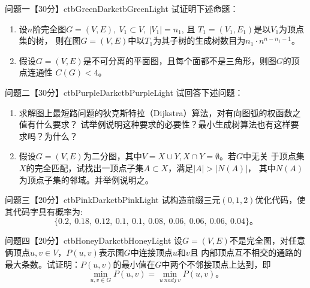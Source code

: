 \documentclass[12pt]{simple_doc}
\begin{document}

    \begin{cbstripe}{问题一【30分】}{ctbGreenDark}{ctbGreenLight}
        试证明下述命题：
        \begin{enumerate}
            \item 设$n$阶完全图$G=(V, E),\ V_1 \subset V,\ \big | V_1 \big | = n_1$, 且
                $T_1=(V_1, E_1)$是以$V_1$为顶点集的树，
                则在图$G=(V, E)$中以$T_1$为其子树的生成树数目为$n_1\cdot n^{n-n_1 -1}$。
            \item 假设$G=(V, E)$是不可分离的平面图，且每个面都不是三角形，则图$G$的顶点连通性
                $C(G) < 4$。
        \end{enumerate}
    \end{cbstripe}

    \begin{cbstripe}{问题二【30分】}{ctbPurpleDark}{ctbPurpleLight}
        试回答下述问题：
        \begin{enumerate}
            \item 求解图上最短路问题的狄克斯特拉（Dijkstra）算法，对有向图弧的权函数之值有什么要求？
                试举例说明这种要求的必要性？最小生成树算法也有这样要求吗？为什么？
            \item 假设$G=(V, E)$为二分图，其中$V=X \cup Y, X \cap Y = \emptyset$。若$G$中无关
                于顶点集$X$的完全匹配，试找出一顶点子集$A \subset X$，满足$|A| > \big |N(A)\big |$，
                其中$N(A)$为顶点子集的邻域。并举例说明之。
        \end{enumerate}
    \end{cbstripe}

    \begin{cbstripe}{问题三【20分】}{ctbPinkDark}{ctbPinkLight}
        试构造前缀三元$(0, 1, 2)$优化代码，使其代码字具有概率为:
        \begin{equation*}
            \{0.2,\ 0.18,\ 0.12,\ 0.1,\ 0.1,\ 0.08,\ 0.06,\ 0.06,\ 0.06,\ 0.04\}。
        \end{equation*}
    \end{cbstripe}

    \begin{cbstripe}{问题四【20分】}{ctbHoneyDark}{ctbHoneyLight}
        设$G=(V, E)$不是完全图，对任意俩顶点$u, v \in V$，$P(u, v)$表示图$G$中连接顶点$u$和$v$且
        内部顶点互不相交的通路的最大条数。试证明：$P(u, v)$的最小值在$G$中两个不邻接顶点上达到，即
        \begin{equation*}
            \min_{u, v \in G} P(u, v) = \min_{u\ \textit{nadj}\ v} P(u, v)。
        \end{equation*}
    \end{cbstripe}
\end{document}
